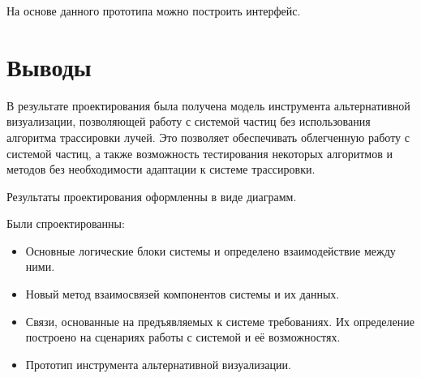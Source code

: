 На основе данного прототипа можно построить интерфейс.

\section{Выводы}

В результате проектирования была получена модель инструмента альтернативной визуализации, позволяющей работу с системой частиц без использования алгоритма трассировки лучей. Это позволяет обеспечивать облегченную работу с системой частиц, а также возможность тестирования некоторых алгоритмов и методов без необходимости адаптации к системе трассировки.

Результаты проектирования оформленны в виде диаграмм.

Были спроектированны:

\begin{itemize}
	\item Основные логические блоки системы и определено взаимодействие между ними.
	\item Новый метод взаимосвязей компонентов системы и их данных.
	\item Связи, основанные на предъявляемых к системе требованиях. Их определение построено на сценариях работы с системой и её возможностях.
	\item Прототип инструмента альтернативной визуализации.
\end{itemize}